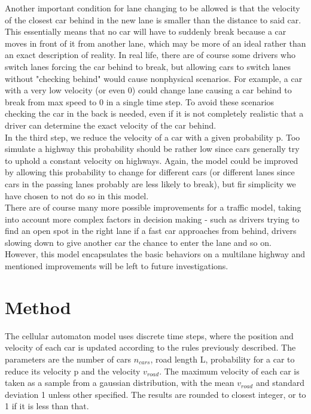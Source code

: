 \documentclass[a4paper,12pt]{article}
\begin{document}
Another important condition for lane changing to be allowed is that the velocity of the closest car behind in the new lane is smaller than the distance to said car. This essentially means that no car will have to suddenly break because a car moves in front of it from another lane, which may be more of an ideal rather than an exact description of reality. In real life, there are of course some drivers who switch lanes forcing the car behind to break, but allowing cars to switch lanes without "checking behind" would cause nonphysical scenarios. For example, a car with a very low velocity (or even 0) could change lane causing a car behind to break from max speed to 0 in a single time step. To avoid these scenarios checking the car in the back is needed, even if it is not completely realistic that a driver can determine the exact velocity of the car behind.\\

In the third step, we reduce the velocity of a car with a given probability p. Too simulate a highway this probability should be rather low since cars generally try to uphold a constant velocity on highways. Again, the model could be improved by allowing this probability to change for different cars (or different lanes since cars in the passing lanes probably are less likely to break), but fir simplicity we have chosen to not do so in this model.\\

There are of course many more possible improvements for a traffic model, taking into account more complex factors in decision making - such as drivers trying to find an open spot in the right lane if a fast car approaches from behind, drivers slowing down to give another car the chance to enter the lane and so on. However, this model encapsulates the basic behaviors on a multilane highway and mentioned improvements will be left to future investigations. 

\section{Method}
The cellular automaton model uses discrete time steps, where the position and velocity of each car is updated according to the rules previously described. The parameters are the number of cars $n_{cars}$, road length L, probability for a car to reduce its velocity p and the velocity $v_{road}$. The maximum velocity of each car is taken as a sample from a gaussian distribution, with the mean $v_{road}$ and standard deviation 1 unless other specified. The results are rounded to closest integer, or to 1 if it is less than that.\\
\end{document}
